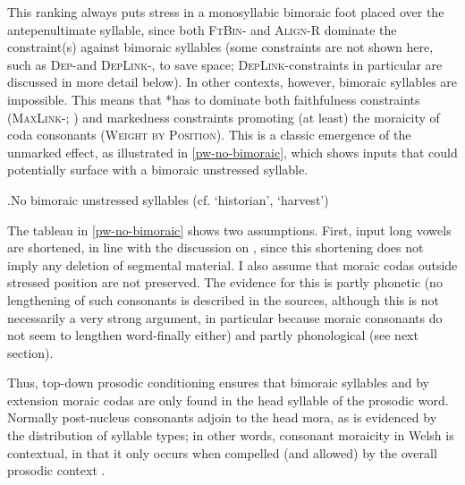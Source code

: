 This ranking always puts stress in a monosyllabic bimoraic foot placed over the antepenultimate syllable, since both \textsc{FtBin}- and \textsc{Align-R} dominate the constraint(s) against bimoraic syllables (some constraints are not shown here, such as \textsc{Dep}-\mo and \textsc{DepLink}-\mo, to save space; \textsc{DepLink}-\mo constraints in particular are discussed in more detail below). In other contexts, however, bimoraic syllables are impossible. This means that *\mo\mo has to  dominate both faithfulness constraints (\textsc{MaxLink}-\mo; \citealt{moren01:_distin}) and markedness constraints promoting (at least) the moraicity of coda consonants (\eg \textsc{Weight by Position}). This is a classic emergence of the unmarked effect, as illustrated in \ref{pw-no-bimoraic}, which shows inputs that could potentially surface with a bimoraic unstressed syllable.

\ex.\label{pw-no-bimoraic}No bimoraic unstressed syllables (cf.\@ \ipa{[haˈneːsið]} `historian', \ipa{[kənˈheia]} `harvest')\\

The tableau in \ref{pw-no-bimoraic} shows two assumptions. First, input long vowels are shortened, in line with the discussion on , since this shortening does not imply any deletion of segmental material. I also assume that moraic codas outside stressed position are not preserved. The evidence for this is partly phonetic (no lengthening of such consonants is described in the sources, although this is not necessarily a very strong argument, in particular because moraic consonants do not seem to lengthen word\hyp finally either) and partly phonological (see next section).

Thus, top-down prosodic conditioning ensures that bimoraic syllables \dash and by extension moraic codas \dash are only found in the head syllable of the prosodic word. Normally post-nucleus consonants adjoin to the head mora, as is evidenced by the distribution of syllable types; in other words, consonant moraicity in Welsh is contextual, in that it only occurs when compelled (and allowed) by the overall prosodic context \citep{rosenthall99:_weigh_posit_posit,moren00:_kashm,moren01:_distin}.

